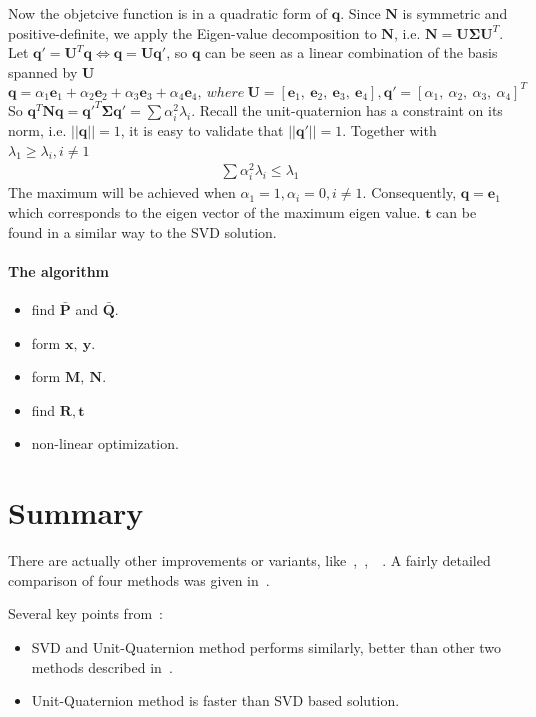 \documentclass[a4paper]{report}
\begin{document}
Now the objetcive function is in a quadratic form of $\mathbf{q}$. Since $\mathbf{N}$ is symmetric and positive-definite, we apply the Eigen-value decomposition to $\mathbf{N}$, i.e. $\mathbf{N}=\mathbf{U}\mathbf{\Sigma}\mathbf{U}^T$. Let $\mathbf{q}'=\mathbf{U}^T\mathbf{q} \Leftrightarrow \mathbf{q}=\mathbf{U}\mathbf{q}'$, so $\mathbf{q}$ can be seen as a linear combination of the basis spanned by $\mathbf{U}$
$$
\mathbf{q}=\alpha_1 \mathbf{e}_1 + \alpha_2 \mathbf{e}_2+\alpha_3 \mathbf{e}_3+\alpha_4 \mathbf{e}_4,\ where\ \mathbf{U}=[\mathbf{e}_1,\ \mathbf{e}_2,\ \mathbf{e}_3,\ \mathbf{e}_4], \mathbf{q}'=[\alpha_1,\ \alpha_2,\ \alpha_3,\ \alpha_4]^T
$$ 
So $\mathbf{q}^T\mathbf{Nq}=\mathbf{q}'^T\mathbf{\Sigma q}'=\sum \alpha_i^2 \lambda_i$. Recall the unit-quaternion has a constraint on its norm, i.e. $||\mathbf{q}||=1$, it is easy to validate that $||\mathbf{q}'||=1$. Together with $\lambda_1 \geq \lambda_i, i \neq 1$
\begin{align*}
\sum \alpha_i^2 \lambda_i \leq \lambda_1
\end{align*}
The maximum will be achieved when $\alpha_1=1, \alpha_i=0, i\neq 1$. Consequently, $\mathbf{q}=\mathbf{e}_1$ which corresponds to the eigen vector of the maximum eigen value. $\mathbf{t}$ can be found in a similar way to the SVD solution.
\paragraph{The algorithm}
\begin{itemize}
	\item find $\bar{\mathbf{P}}$ and $\bar{\mathbf{Q}}$.
	\item form $\mathbf{x},\ \mathbf{y}$.
	\item form $\mathbf{M},\ \mathbf{N}$.
	\item find $\mathbf{R, t}$
	\item non-linear optimization.
\end{itemize}

\section{Summary}
There are actually other improvements or variants, like~\cite{291441},~\cite{Horn88},~\cite{Umeyama:1991:LET:105514.105525}~\cite{Walker:1991:ELP:119076.119080}. A fairly detailed comparison of four methods was given in~\cite{Eggert1997}. 

Several key points from~\cite{Eggert1997}:
\begin{itemize}
\item SVD and Unit-Quaternion method performs similarly, better than other two methods described in~\cite{Eggert1997}. 
\item Unit-Quaternion method is faster than SVD based solution.
\end{itemize}
\end{document}
